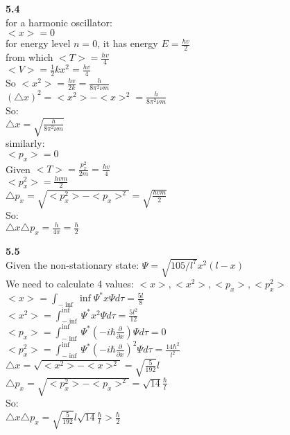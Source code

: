 \documentclass{article}
\begin{document}
\textbf{5.4}\\
for a harmonic oscillator:\\
$<x> = 0$\\
for energy level $n = 0$, it has energy $E = \frac{hv}{2}$\\
from which $<T> = \frac{hv}{4}$\\
$<V> = \frac{1}{2}kx^2 = \frac{hv}{4}$\\
So $<x^2> = \frac{hv}{2k} = \frac{h}{8\pi^2\nu m}$\\
$(\triangle x)^2 = <x^2> - <x>^2 = \frac{h}{8\pi^2\nu m}$\\
So:\\
$\triangle x = \sqrt{\frac{h}{8\pi^2\nu m}}$\\
similarly:\\
$<p_x> = 0$\\
Given $<T> = \frac{p^2_x}{2m} = \frac{hv}{4}$\\
$<p^2_x> = \frac{hvm}{2}$\\
$\triangle p_x = \sqrt{<p^2_x> - <p_x>^2} = \sqrt{\frac{hvm}{2}}$\\
So:\\
$\triangle x \triangle p_x = \frac{h}{4\pi} = \frac{\hbar}{2}$\\
\newline

\textbf{5.5}\\
Given the non-stationary state:
$\Psi = \sqrt{105/l^7}x^2(l-x)$\\
We need to calculate 4 values: $<x>, <x^2>, <p_x>, <p^2_x>$\\
$<x> = \int_{-\inf}{\inf}\Psi^*x\Psi d\tau = \frac{5l}{8}$\\
$<x^2> = \int_{-\inf}^{\inf}\Psi^*x^2\Psi d\tau= \frac{5l^2}{12}$\\
$<p_x> = \int_{-\inf}^{\inf}\Psi^*(-i\hbar\frac{\partial}{\partial x})\Psi d\tau = 0$\\
$<p^2_x> = \int_{-\inf}^{\inf}\Psi^*(-i\hbar\frac{\partial}{\partial x})^2\Psi d\tau = \frac{14\hbar^2}{l^2}$\\
$\triangle x = \sqrt{<x^2> - <x>^2} = \sqrt{\frac{5}{192}}l$\\
$\triangle p_x = \sqrt{<p^2_x> - <p_x>^2} = \sqrt{14}\frac{\hbar}{l}$\\
So:\\
$\triangle x \triangle p_x = \sqrt{\frac{5}{192}}l \sqrt{14}\frac{\hbar}{l} > \frac{\hbar}{2}$\\
\newline
\end{document}
